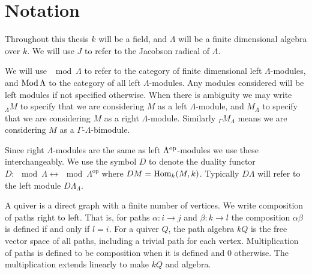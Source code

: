 \section*{Notation}
%
Throughout this thesis $k$ will be a field, and $\Lambda$ will be a finite dimensional algebra over $k$. We will use $J$ to refer to the Jacobson radical of $\Lambda$.


We will use $\mod\Lambda$ to refer to the category of finite dimensional left $\Lambda$-modules, and $\operatorname{Mod}\Lambda$ to the category of all left $\Lambda$-modules. Any modules considered will be left modules if not specified otherwise. When there is ambiguity we may write $_\Lambda M$ to specify that we are considering $M$ as a left $\Lambda$-module, and $M_\Lambda$ to specify that we are considering $M$ as a right $\Lambda$-module. Similarly $_\Gamma M_\Lambda$ means we are considering $M$ as a $\Gamma$-$\Lambda$-bimodule.


Since right $\Lambda$-modules are the same as left $\Lambda^{\operatorname{op}}$-modules we use these interchangeably. We use the symbol $D$ to denote the duality functor $D\colon \mod \Lambda \leftrightarrow \mod\Lambda^{\operatorname{op}}$ where $DM = \operatorname{Hom}_k(M, k)$. Typically $D\Lambda$ will refer to the left module $D\Lambda_\Lambda$.


A quiver is a direct graph with a finite number of vertices. We write composition of paths right to left. That is, for paths $\alpha\colon i \to j$ and $\beta\colon k\to l$ the composition $\alpha\beta$ is defined if and only if $l=i$. For a quiver $Q$, the path algebra $kQ$ is the free vector space of all paths, including a trivial path for each vertex. Multiplication of paths is defined to be composition when it is defined and 0 otherwise. The multiplication extends linearly to make $kQ$ and algebra.



